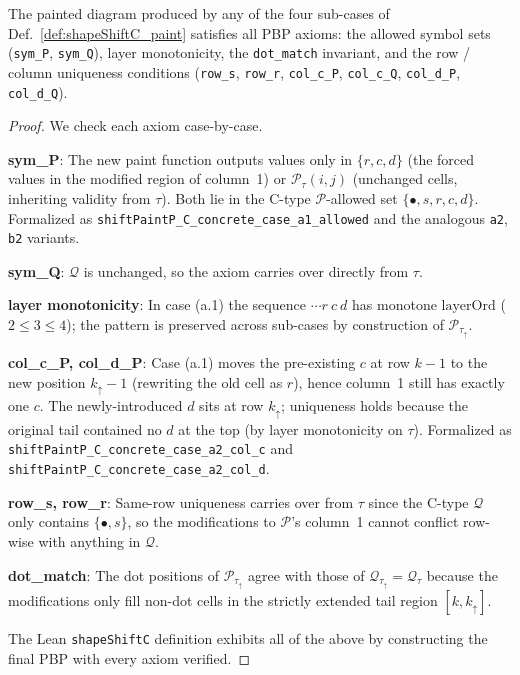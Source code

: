 \begin{lemma}
  \label{cor:shapeShiftC_valid}
  \leanok
  The painted diagram produced by any of the four sub-cases of
  Def.~\ref{def:shapeShiftC_paint} satisfies all PBP axioms: the allowed
  symbol sets (\texttt{sym\_P}, \texttt{sym\_Q}), layer monotonicity, the
  \texttt{dot\_match} invariant, and the row / column uniqueness conditions
  (\texttt{row\_s}, \texttt{row\_r}, \texttt{col\_c\_P}, \texttt{col\_c\_Q},
  \texttt{col\_d\_P}, \texttt{col\_d\_Q}).
\end{lemma}
\begin{proof}
  \leanok
  We check each axiom case-by-case.

  \textbf{sym\_P}: The new paint function outputs values only in
  $\{r, c, d\}$ (the forced values in the modified region of column~1) or
  $\mathcal{P}_\tau(i, j)$ (unchanged cells, inheriting validity from $\tau$).
  Both lie in the C-type $\mathcal{P}$-allowed set $\{\bullet, s, r, c, d\}$.
  Formalized as \texttt{shiftPaintP\_C\_concrete\_case\_a1\_allowed} and
  the analogous \texttt{a2}, \texttt{b2} variants.

  \textbf{sym\_Q}: $\mathcal{Q}$ is unchanged, so the axiom carries over
  directly from $\tau$.

  \textbf{layer monotonicity}: In case (a.1) the sequence $\cdots r\ c\ d$
  has monotone $\mathrm{layerOrd}$ ($2 \le 3 \le 4$); the pattern is
  preserved across sub-cases by construction of $\mathcal{P}_{\tau_\uparrow}$.

  \textbf{col\_c\_P, col\_d\_P}: Case (a.1) moves the pre-existing $c$ at
  row $k-1$ to the new position $k_\uparrow - 1$ (rewriting the old cell as
  $r$), hence column~1 still has exactly one $c$. The newly-introduced $d$
  sits at row $k_\uparrow$; uniqueness holds because the original tail
  contained no $d$ at the top (by layer monotonicity on $\tau$).
  Formalized as \texttt{shiftPaintP\_C\_concrete\_case\_a2\_col\_c} and
  \texttt{shiftPaintP\_C\_concrete\_case\_a2\_col\_d}.

  \textbf{row\_s, row\_r}: Same-row uniqueness carries over from $\tau$
  since the C-type $\mathcal{Q}$ only contains $\{\bullet, s\}$, so the
  modifications to $\mathcal{P}$'s column~1 cannot conflict row-wise with
  anything in $\mathcal{Q}$.

  \textbf{dot\_match}: The dot positions of $\mathcal{P}_{\tau_\uparrow}$
  agree with those of $\mathcal{Q}_{\tau_\uparrow} = \mathcal{Q}_\tau$
  because the modifications only fill non-dot cells in the strictly
  extended tail region $[k, k_\uparrow]$.

  The Lean \texttt{shapeShiftC} definition exhibits all of the above by
  constructing the final PBP with every axiom verified.
\end{proof}


